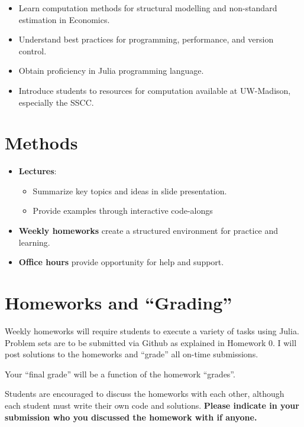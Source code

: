 \documentclass[
]{book}
\providecommand{\tightlist}{%
  \setlength{\itemsep}{0pt}\setlength{\parskip}{0pt}}
\begin{document}
\begin{itemize}
\tightlist
\item
  Learn computation methods for structural modelling and non-standard estimation in Economics.
\item
  Understand best practices for programming, performance, and version control.
\item
  Obtain proficiency in Julia programming language.
\item
  Introduce students to resources for computation available at UW-Madison, especially the SSCC.
\end{itemize}

\hypertarget{methods}{%
\section{Methods}\label{methods}}

\begin{itemize}
\tightlist
\item
  \textbf{Lectures}:

  \begin{itemize}
  \tightlist
  \item
    Summarize key topics and ideas in slide presentation.
  \item
    Provide examples through interactive code-alongs
  \end{itemize}
\item
  \textbf{Weekly homeworks} create a structured environment for practice and learning.
\item
  \textbf{Office hours} provide opportunity for help and support.
\end{itemize}

\hypertarget{homeworks-and-grading}{%
\section{Homeworks and ``Grading''}\label{homeworks-and-grading}}

Weekly homeworks will require students to execute a variety of tasks using Julia. Problem sets are to be submitted via Github as explained in Homework 0. I will post solutions to the homeworks and ``grade'' all on-time submissions.

Your ``final grade'' will be a function of the homework ``grades''.

Students are encouraged to discuss the homeworks with each other, although each student must write their own code and solutions. \textbf{Please indicate in your submission who you discussed the homework with if anyone.}
\end{document}
